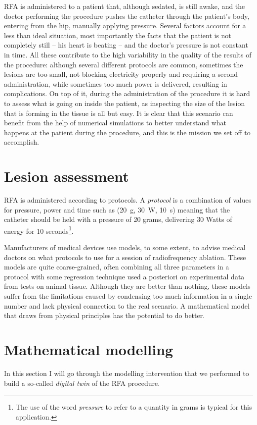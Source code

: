RFA is administered to a patient that, although sedated, is still awake, and the doctor performing the procedure pushes the catheter through the patient's body, entering from the hip, manually applying pressure.
Several factors account for a less than ideal situation, most importantly the facts that the patient is not completely still -- his heart is beating -- and the doctor's pressure is not constant in time.
All these contribute to the high variability in the quality of the results of the procedure: although several different protocols are common, sometimes the lesions are too small, not blocking electricity properly and requiring a second administration, while sometimes too much power is delivered, resulting in complications.
On top of it, during the administration of the procedure it is hard to assess what is going on inside the patient, as inspecting the size of the lesion that is forming in the tissue is all but easy.
It is clear that this scenario can benefit from the help of numerical simulations to better understand what happens at the patient during the procedure, and this is the mission we set off to accomplish.

\section{Lesion assessment}
\label{sec_rfaLesion}
RFA is administered according to protocols.
A \emph{protocol} is a combination of values for pressure, power and time such as (\SI{20}{g}, \SI{30}{W}, \SI{10}{s}) meaning that the catheter should be held with a pressure of 20 grams, delivering 30 Watts of energy for 10 seconds\footnote{The use of the word \emph{pressure} to refer to a quantity in grams is typical for this application.}.

Manufacturers of medical devices use models, to some extent, to advise medical doctors on what protocols to use for a session of radiofrequency ablation.
These models are quite coarse-grained, often combining all three parameters in a protocol with some regression technique used a posteriori on experimental data from tests on animal tissue.
Although they are better than nothing, these models suffer from the limitations caused by condensing too much information in a single number and lack physical connection to the real scenario.
A mathematical model that draws from physical principles has the potential to do better.

\section{Mathematical modelling}
\label{sec_rfaModel}
In this section I will go through the modelling intervention that we performed to build a so-called \emph{digital twin} of the RFA procedure.

